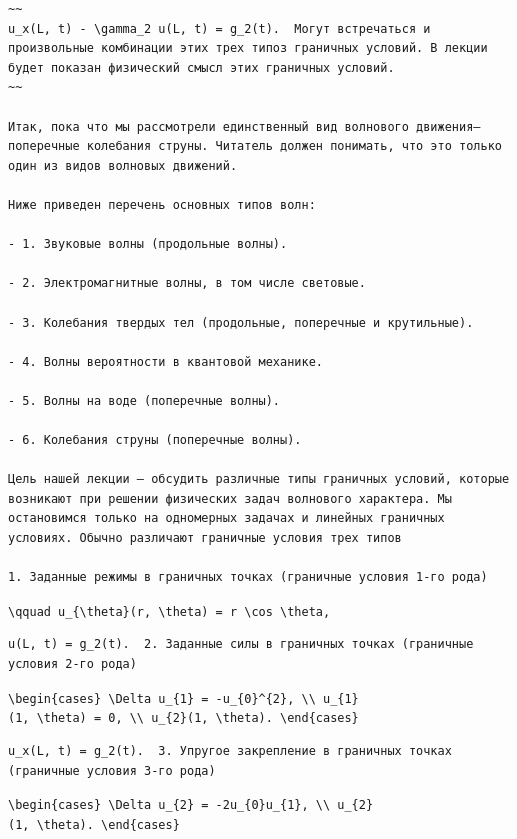 \documentclass[
  ukrainian,
]{article}
\begin{document}
\begin{verbatim}
~~
u_x(L, t) - \gamma_2 u(L, t) = g_2(t).  Могут встречаться и произвольные комбинации этих трех типоз граничных условий. В лекции будет показан физический смысл этих граничных условий.
~~

Итак, пока что мы рассмотрели единственный вид волнового движения—поперечные колебания струны. Читатель должен понимать, что это только один из видов волновых движений.

Ниже приведен перечень основных типов волн:

- 1. Звуковые волны (продольные волны).

- 2. Электромагнитные волны, в том числе световые.

- 3. Колебания твердых тел (продольные, поперечные и крутильные).

- 4. Волны вероятности в квантовой механике.

- 5. Волны на воде (поперечные волны).

- 6. Колебания струны (поперечные волны).

Цель нашей лекции — обсудить различные типы граничных условий, которые возникают при решении физических задач волнового характера. Мы остановимся только на одномерных задачах и линейных граничных условиях. Обычно различают граничные условия трех типов

1. Заданные режимы в граничных точках (граничные условия 1-го рода)
\end{verbatim}

\texttt{\textbackslash{}qquad\ u\_\{\textbackslash{}theta\}(r,\ \textbackslash{}theta)\ =\ r\ \textbackslash{}cos\ \textbackslash{}theta,}

\begin{verbatim}
u(L, t) = g_2(t).  2. Заданные силы в граничных точках (граничные условия 2-го рода)
\end{verbatim}

\texttt{\textbackslash{}begin\{cases\}\ \textbackslash{}Delta\ u\_\{1\}\ =\ -u\_\{0\}\^{}\{2\},\ \textbackslash{}\textbackslash{}\ u\_\{1\}(1,\ \textbackslash{}theta)\ =\ 0,\ \textbackslash{}\textbackslash{}\ u\_\{2\}(1,\ \textbackslash{}theta).\ \textbackslash{}end\{cases\}}

\begin{verbatim}
u_x(L, t) = g_2(t).  3. Упругое закрепление в граничных точках (граничные условия 3-го рода)
\end{verbatim}

\texttt{\textbackslash{}begin\{cases\}\ \textbackslash{}Delta\ u\_\{2\}\ =\ -2u\_\{0\}u\_\{1\},\ \textbackslash{}\textbackslash{}\ u\_\{2\}(1,\ \textbackslash{}theta).\ \textbackslash{}end\{cases\}}
\end{document}
